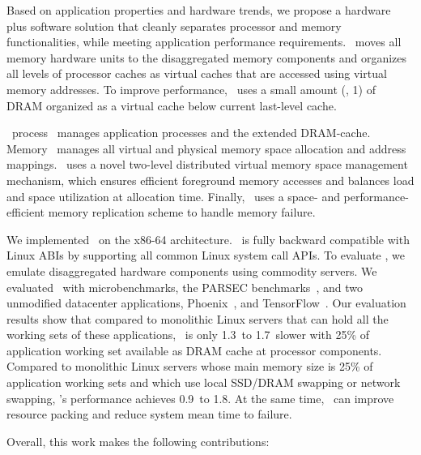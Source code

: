 \documentclass[10pt,times,twocolumn]{z2-article}
\begin{document}
Based on application properties and hardware trends, 
we propose a hardware plus software solution that cleanly separates processor and memory functionalities,
while meeting application performance requirements.
\lego\ moves all memory hardware units to the disaggregated memory components
and organizes all levels of processor caches as virtual caches that are accessed using virtual memory addresses. 
To improve performance, \lego\ uses a small amount (\eg, 1\GB) of DRAM
organized as a virtual cache below current last-level cache.

\lego\ process \microos\ manages application processes and the extended DRAM-cache.
Memory \microos\ manages all virtual and physical memory space allocation and address mappings. 
\lego\ uses a novel two-level distributed virtual memory space management mechanism,
which ensures efficient foreground memory accesses and balances load and space utilization at allocation time.
Finally, \lego\ uses a space- and performance-efficient memory replication scheme to handle memory failure.

We implemented \lego\ on the x86-64 architecture.
\lego\ is fully backward compatible with Linux ABIs
by supporting all common Linux system call APIs.
To evaluate \lego, we emulate disaggregated hardware components using commodity servers.
We evaluated \lego\ with microbenchmarks, the PARSEC benchmarks~\cite{PARSEC}, %
and two unmodified datacenter applications, Phoenix~\cite{Ranger07-HPCA},
and TensorFlow~\cite{TensorFlow}.
Our evaluation results show that compared to monolithic Linux servers that can hold all the working sets of these applications,
\lego\ is only 1.3\x\ to 1.7\x\ slower with 25\% of application working set available as DRAM cache at processor components.
Compared to monolithic Linux servers whose main memory size is 25\% of application working sets
and which use local SSD/DRAM swapping or network swapping,
\lego's performance achieves 0.9\x\ to 1.8\x.
At the same time, \lego\ can improve resource packing %
and reduce system mean time to failure. %

Overall, this work makes the following contributions:
\end{document}
